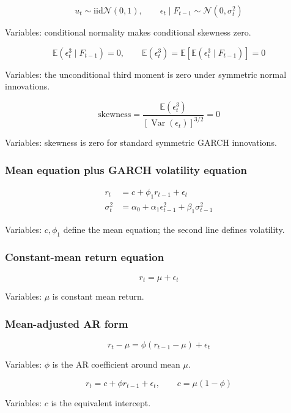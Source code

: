 \documentclass[
  8pt,
  twocolumn]{extarticle}
\begin{document}
\[
u_t\sim\mathrm{iid}\mathcal N(0,1),\qquad \epsilon_t\mid F_{t-1}\sim\mathcal N(0,\sigma_t^2)
\]

Variables: conditional normality makes conditional skewness zero.

\[
\mathbb E(\epsilon_t^3\mid F_{t-1})=0,\qquad
\mathbb E(\epsilon_t^3)=\mathbb E[\mathbb E(\epsilon_t^3\mid F_{t-1})]=0
\]

Variables: the unconditional third moment is zero under symmetric normal
innovations.

\[
\text{skewness}=\frac{\mathbb E(\epsilon_t^3)}{[\operatorname{Var}(\epsilon_t)]^{3/2}}=0
\]

Variables: skewness is zero for standard symmetric GARCH innovations.

\subsubsection{Mean equation plus GARCH volatility
equation}\label{mean-equation-plus-garch-volatility-equation}

\[
\begin{aligned}
r_t&=c+\phi_1r_{t-1}+\epsilon_t\\
\sigma_t^2&=\alpha_0+\alpha_1\epsilon_{t-1}^2+\beta_1\sigma_{t-1}^2
\end{aligned}
\]

Variables: \(c,\phi_1\) define the mean equation; the second line
defines volatility.

\subsubsection{Constant-mean return
equation}\label{constant-mean-return-equation}

\[
r_t=\mu+\epsilon_t
\]

Variables: \(\mu\) is constant mean return.

\subsubsection{Mean-adjusted AR form}\label{mean-adjusted-ar-form}

\[
r_t-\mu=\phi(r_{t-1}-\mu)+\epsilon_t
\]

Variables: \(\phi\) is the AR coefficient around mean \(\mu\).

\[
r_t=c+\phi r_{t-1}+\epsilon_t,\qquad c=\mu(1-\phi)
\]

Variables: \(c\) is the equivalent intercept.
\end{document}
